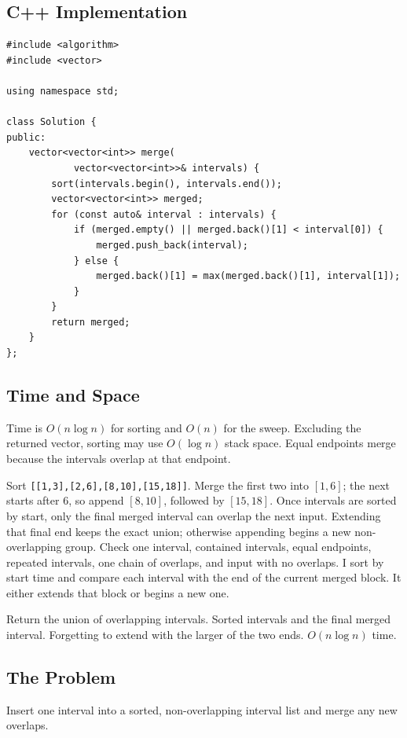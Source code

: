\subsection{C++ Implementation}
\begin{lstlisting}[style=compactcode,caption={Complete C++ solution: Merge Intervals}]
#include <algorithm>
#include <vector>

using namespace std;

class Solution {
public:
    vector<vector<int>> merge(
            vector<vector<int>>& intervals) {
        sort(intervals.begin(), intervals.end());
        vector<vector<int>> merged;
        for (const auto& interval : intervals) {
            if (merged.empty() || merged.back()[1] < interval[0]) {
                merged.push_back(interval);
            } else {
                merged.back()[1] = max(merged.back()[1], interval[1]);
            }
        }
        return merged;
    }
};
\end{lstlisting}

\subsection{Time and Space}
Time is \(O(n\log n)\) for sorting and \(O(n)\) for the sweep. Excluding the
returned vector, sorting may use \(O(\log n)\) stack space. Equal endpoints
merge because the intervals overlap at that endpoint.

\lessonexpansion
  {Sort \texttt{[[1,3],[2,6],[8,10],[15,18]]}. Merge the first two into
   \([1,6]\); the next starts after 6, so append \([8,10]\), followed by
   \([15,18]\).}
  {Once intervals are sorted by start, only the final merged interval can
   overlap the next input. Extending that final end keeps the exact union;
   otherwise appending begins a new non-overlapping group.}
  {Check one interval, contained intervals, equal endpoints, repeated
   intervals, one chain of overlaps, and input with no overlaps.}
  {I sort by start time and compare each interval with the end of the current
   merged block. It either extends that block or begins a new one.}

\chaptercheckpoint
  {Return the union of overlapping intervals.}
  {Sorted intervals and the final merged interval.}
  {Forgetting to extend with the larger of the two ends.}
  {$O(n\log n)$ time.}



\subsection{The Problem}
Insert one interval into a sorted, non-overlapping interval list and merge any
new overlaps.

